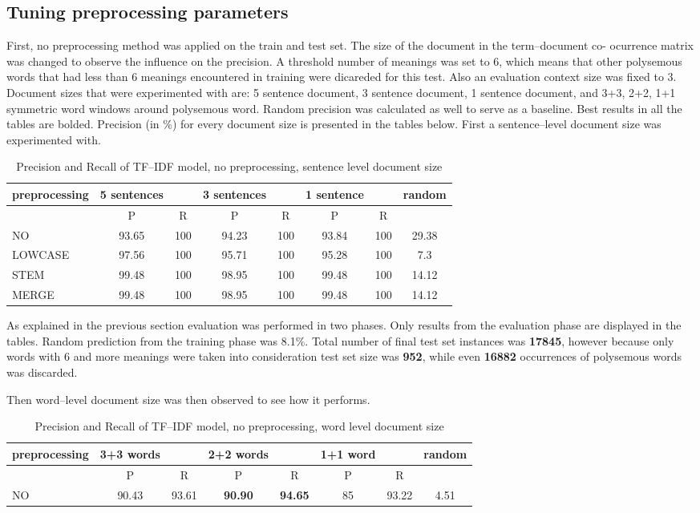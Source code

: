 \subsection{Tuning preprocessing parameters}
First, no preprocessing method was applied on the train and test set. The size of the document in the term--document co-
ocurrence matrix was changed to observe the influence on the precision. A threshold number of meanings was set to 6, which means that other polysemous words that had less than 6 meanings encountered in training were dicareded for this test. Also an evaluation context size was fixed to 3. Document sizes that were
experimented with are: 5 sentence document, 3 sentence document, 1 sentence document, and 3+3, 2+2, 1+1 symmetric word windows around polysemous word.  
Random precision was calculated as well to serve as a baseline. 
Best results in all the tables are bolded. 
Precision (in \%) for every document size is presented in the tables below. First a sentence--level 
document size was experimented with. 
\begin{table}[h!]
\begin{tabular}{ l | c c | c c | c c | c}
   preprocessing &  5 sentences && 3 sentences && 1 sentence  && random\\
\hline
	& P  &  R & P  &  R & P  &  R &\\
\hline\hline
NO  & 93.65 & 100 & 94.23 & 100 & 93.84 & 100 & 29.38 \\
LOWCASE  & 97.56 & 100 & 95.71 & 100 & 95.28 & 100 & 7.3 \\
STEM  & 99.48 & 100 & 98.95 & 100 & 99.48 & 100 & 14.12 \\
MERGE  & 99.48 & 100 & 98.95 & 100 & 99.48 & 100 & 14.12 \\

\end{tabular}
\caption{Precision and Recall of TF--IDF model, no preprocessing, sentence level document size}
\end{table}

As explained in the previous section evaluation was performed in two phases. Only results from the 
evaluation phase are displayed in the tables. Random prediction from the training phase was 8.1\%.
Total number of final test set instances was \textbf{17845}, however because only words with 6 and more 
meanings were taken into consideration test set size was \textbf{952}, while even \textbf{16882} occurrences of 
polysemous words was discarded.

Then word--level document size was then observed to see how it performs. 
\begin{table}[h!]
\begin{tabular}{ l | c c | c c | c c | c}
   preprocessing &  3+3 words && 2+2 words && 1+1 word  && random\\
\hline\hline
	& P  &  R & P  &  R & P  &  R &\\
\hline
NO & 90.43  & 93.61 & \textbf{90.90} & \textbf{94.65} & 85 & 93.22 & 4.51 \\
\end{tabular}
\caption{Precision and Recall of TF--IDF model, no preprocessing, word level document size}
\end{table}

